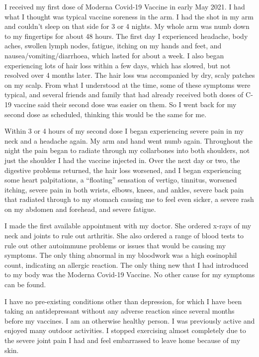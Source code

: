 I received my first dose of Moderna Covid-19 Vaccine in early May 2021. I had
what I thought was typical vaccine soreness in the arm. I had the shot in my arm
and couldn’t sleep on that side for 3 or 4 nights. My whole arm was numb down to
my fingertips for about 48 hours. The first day I experienced headache, body
aches, swollen lymph nodes, fatigue, itching on my hands and feet, and
nausea/vomiting/diarrhoea, which lasted for about a week. I also began
experiencing lots of hair loss within a few days, which has slowed, but not
resolved over 4 months later. The hair loss was accompanied by dry, scaly
patches on my scalp. From what I understood at the time, some of these symptoms
were typical, and several friends and family that had already received both
doses of C-19 vaccine said their second dose was easier on them. So I went back
for my second dose as scheduled, thinking this would be the same for me.

Within 3 or 4 hours of my second dose I began experiencing severe pain in my
neck and a headache again. My arm and hand went numb again. Throughout the night
the pain began to radiate through my collarbones into both shoulders, not just
the shoulder I had the vaccine injected in. Over the next day or two, the
digestive problems returned, the hair loss worsened, and I began experiencing
some heart palpitations, a “floating” sensation of vertigo, tinnitus, worsened
itching, severe pain in both wrists, elbows, knees, and ankles, severe back pain
that radiated through to my stomach causing me to feel even sicker, a severe
rash on my abdomen and forehead, and severe fatigue.

I made the first available appointment with my doctor. She ordered x-rays of my
neck and joints to rule out arthritis. She also ordered a range of blood tests
to rule out other autoimmune problems or issues that would be causing my
symptoms. The only thing abnormal in my bloodwork was a high eosinophil count,
indicating an allergic reaction. The only thing new that I had introduced to my
body was the Moderna Covid-19 Vaccine. No other cause for my symptoms can be
found.

I have no pre-existing conditions other than depression, for which I have been
taking an antidepressant without any adverse reaction since several months
before my vaccines. I am an otherwise healthy person. I was previously active
and enjoyed many outdoor activities. I stopped exercising almost completely due
to the severe joint pain I had and feel embarrassed to leave home because of my
skin.

